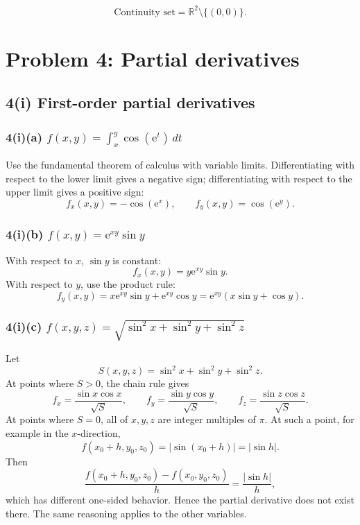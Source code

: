 \documentclass[11pt]{article}
\newcommand{\R}{\mathbb{R}}
\newcommand{\dd}{\,d}
\newcommand{\e}{\mathrm e}
\begin{document}
\begin{answerbox}
\[
\boxed{\text{Continuity set}=\R^2\setminus\{(0,0)\}.}
\]
\end{answerbox}

\newpage
\section{Problem 4: Partial derivatives}

\subsection{4(i) First-order partial derivatives}

\subsubsection*{4(i)(a) \(\displaystyle f(x,y)=\int_x^y\cos(\e^t)\dd t\)}

Use the fundamental theorem of calculus with variable limits. Differentiating with respect to the lower limit gives a negative sign; differentiating with respect to the upper limit gives a positive sign:
\[
f_x(x,y)=-\cos(\e^x),
\qquad
f_y(x,y)=\cos(\e^y).
\]

\subsubsection*{4(i)(b) \(f(x,y)=\e^{xy}\sin y\)}

With respect to \(x\), \(\sin y\) is constant:
\[
f_x(x,y)=y\e^{xy}\sin y.
\]
With respect to \(y\), use the product rule:
\[
f_y(x,y)=x\e^{xy}\sin y+\e^{xy}\cos y
=\e^{xy}(x\sin y+
\cos y).
\]

\subsubsection*{4(i)(c) \(\displaystyle f(x,y,z)=\sqrt{\sin^2x+\sin^2y+\sin^2z}\)}

Let
\[
S(x,y,z)=\sin^2x+\sin^2y+\sin^2z.
\]
At points where \(S>0\), the chain rule gives
\[
f_x=\frac{\sin x\cos x}{\sqrt{S}},
\qquad
f_y=\frac{\sin y\cos y}{\sqrt{S}},
\qquad
f_z=\frac{\sin z\cos z}{\sqrt{S}}.
\]
At points where \(S=0\), all of \(x,y,z\) are integer multiples of \(\pi\). At such a point, for example in the \(x\)-direction,
\[
f(x_0+h,y_0,z_0)=|\sin(x_0+h)|=|\sin h|.
\]
Then
\[
\frac{f(x_0+h,y_0,z_0)-f(x_0,y_0,z_0)}{h}=\frac{|\sin h|}{h},
\]
which has different one-sided behavior. Hence the partial derivative does not exist there. The same reasoning applies to the other variables.
\end{document}
